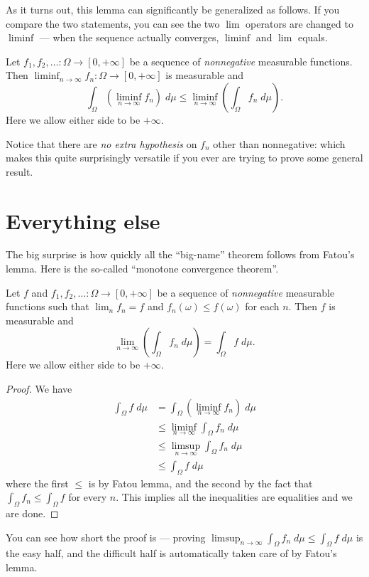 As it turns out, this lemma can significantly be generalized as follows.
If you compare the two statements, you can see the two $\lim$ operators are changed to $\liminf$ ---
when the sequence actually converges, $\liminf$ and $\lim$ equals.
\begin{lemma}
	Let $f_1, f_2, \dots \colon \Omega \to [0,+\infty]$
	be a sequence of \emph{nonnegative} measurable functions.
	Then $\liminf_{n \to \infty} f_n \colon \Omega \to [0,+\infty]$ is measurable and
	\[ \int_\Omega \left( \liminf_{n \to \infty} f_n \right) \; d\mu
		\le \liminf_{n \to \infty} \left( \int_\Omega f_n \; d\mu \right).  \]
	Here we allow either side to be $+\infty$.
\end{lemma}
Notice that there are \emph{no extra hypothesis}
on $f_n$ other than nonnegative: which makes this quite surprisingly versatile
if you ever are trying to prove some general result.

\section{Everything else}
The big surprise is how quickly all the ``big-name''
theorem follows from Fatou's lemma.
Here is the so-called ``monotone convergence theorem''.
\begin{corollary}
	Let $f$ and $f_1, f_2, \dots \colon \Omega \to [0,+\infty]$
	be a sequence of \emph{nonnegative}
	measurable functions such that $\lim_n f_n = f$
	and $f_n(\omega) \le f(\omega)$ for each $n$.
	Then $f$ is measurable and
	\[ \lim_{n \to \infty} \left( \int_\Omega f_n \; d\mu \right)
		= \int_\Omega f \; d\mu. \]
	Here we allow either side to be $+\infty$.
\end{corollary}
\begin{proof}
	We have
	\begin{align*}
		\int_\Omega f \; d\mu
		&= \int_\Omega \left( \liminf_{n \to \infty} f_n \right) \; d\mu \\
		&\le \liminf_{n \to \infty} \int_\Omega f_n \; d\mu \\
		&\le \limsup_{n \to \infty} \int_\Omega f_n \; d\mu \\
		&\le \int_\Omega f \; d\mu
	\end{align*}
	where the first $\le$ is by Fatou lemma,
	and the second by the fact that
	$\int_\Omega f_n \le \int_\Omega f$ for every $n$.
	This implies all the inequalities are equalities and we are done.
\end{proof}
You can see how short the proof is ---
proving $\limsup_{n \to \infty} \int_\Omega f_n \; d\mu \le \int_\Omega f \; d\mu$ is the easy half,
and the difficult half is automatically taken care of by Fatou's lemma.


